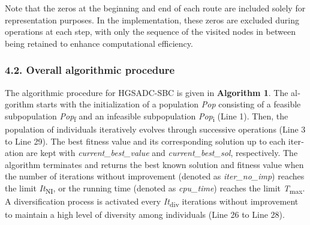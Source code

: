 \documentclass[
  english,
]{article}
\begin{document}
\begin{otherlanguage}{english}
\protect{}\label{p0305}
Note that the zeros at the beginning and end of each route are included solely for representation
purposes. In the implementation, these zeros are excluded during operations at each step, with only
the sequence of the visited nodes in between being retained to enhance computational efficiency.

\protect{}\label{s0055}
\subsubsection{4.2. Overall algorithmic procedure}\label{st075}

\protect{}\label{p0310}
The algorithmic procedure for HGSADC-SBC is given in \textbf{Algorithm 1}. The algorithm starts with
the initialization of a population \emph{Pop} consisting of a feasible subpopulation
\emph{Pop}\textsubscript{f} and an infeasible subpopulation \emph{Pop}\textsubscript{i} (Line 1).
Then, the population of individuals iteratively evolves through successive operations (Line 3 to
Line 29). The best fitness value and its corresponding solution up to each iteration are kept with
\emph{current\_best\_value} and \emph{current\_best\_sol}, respectively. The algorithm terminates
and returns the best known solution and fitness value when the number of iterations without
improvement (denoted as \emph{iter\_no\_imp}) reaches the limit \emph{It}\textsubscript{NI}, or the
running time (denoted as \emph{cpu\_time}) reaches the limit \emph{T}\textsubscript{max}. A
diversification process is activated every \emph{It}\textsubscript{div} iterations without
improvement to maintain a high level of diversity among individuals (Line 26 to Line 28).


\end{otherlanguage}
\end{document}
